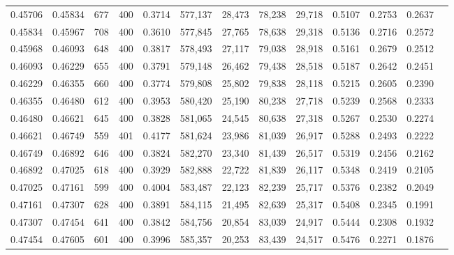 \begin{tabular}{rrrrrrrrrrrrr}
0.45706 & 0.45834 &    677 &   400 &                                     0.3714 & 577,137 &  28,473 &  78,238 &  29,718 & 0.5107 & 0.2753 & 0.2637 \\
0.45834 & 0.45967 &    708 &   400 &                                     0.3610 & 577,845 &  27,765 &  78,638 &  29,318 & 0.5136 & 0.2716 & 0.2572 \\
0.45968 & 0.46093 &    648 &   400 &                                     0.3817 & 578,493 &  27,117 &  79,038 &  28,918 & 0.5161 & 0.2679 & 0.2512 \\
0.46093 & 0.46229 &    655 &   400 &                                     0.3791 & 579,148 &  26,462 &  79,438 &  28,518 & 0.5187 & 0.2642 & 0.2451 \\
0.46229 & 0.46355 &    660 &   400 &                                     0.3774 & 579,808 &  25,802 &  79,838 &  28,118 & 0.5215 & 0.2605 & 0.2390 \\
0.46355 & 0.46480 &    612 &   400 &                                     0.3953 & 580,420 &  25,190 &  80,238 &  27,718 & 0.5239 & 0.2568 & 0.2333 \\
0.46480 & 0.46621 &    645 &   400 &                                     0.3828 & 581,065 &  24,545 &  80,638 &  27,318 & 0.5267 & 0.2530 & 0.2274 \\
0.46621 & 0.46749 &    559 &   401 &                                     0.4177 & 581,624 &  23,986 &  81,039 &  26,917 & 0.5288 & 0.2493 & 0.2222 \\
0.46749 & 0.46892 &    646 &   400 &                                     0.3824 & 582,270 &  23,340 &  81,439 &  26,517 & 0.5319 & 0.2456 & 0.2162 \\
0.46892 & 0.47025 &    618 &   400 &                                     0.3929 & 582,888 &  22,722 &  81,839 &  26,117 & 0.5348 & 0.2419 & 0.2105 \\
0.47025 & 0.47161 &    599 &   400 &                                     0.4004 & 583,487 &  22,123 &  82,239 &  25,717 & 0.5376 & 0.2382 & 0.2049 \\
0.47161 & 0.47307 &    628 &   400 &                                     0.3891 & 584,115 &  21,495 &  82,639 &  25,317 & 0.5408 & 0.2345 & 0.1991 \\
0.47307 & 0.47454 &    641 &   400 &                                     0.3842 & 584,756 &  20,854 &  83,039 &  24,917 & 0.5444 & 0.2308 & 0.1932 \\
0.47454 & 0.47605 &    601 &   400 &                                     0.3996 & 585,357 &  20,253 &  83,439 &  24,517 & 0.5476 & 0.2271 & 0.1876 \\

\end{tabular}

